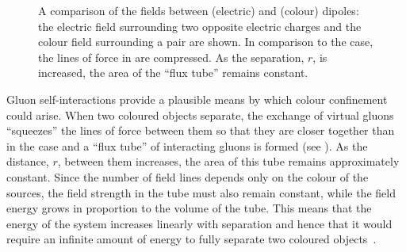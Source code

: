 \begin{figure}[htpb]
  \qquad
  \caption{A comparison of the fields between \QED (electric) and \QCD (colour) dipoles: \protect{} the electric field surrounding two opposite electric charges and \protect{} the colour field surrounding a \qqbar pair  are shown. In comparison to the \QED case, the lines of force in \QCD are compressed. As the \qqbar separation, $r$, is increased, the  area of the \QCD ``flux tube'' remains constant.}
  \label{fig:bg-theory:qedqcddipoles}
\end{figure}

Gluon self-interactions provide a plausible means by which colour confinement could arise.
When two coloured objects separate, the exchange of virtual gluons ``squeezes'' the lines of force between them so that they are closer together than in the \QED case and a ``flux tube'' of interacting gluons is formed (see ).
As the distance, $r$, between them increases, the \xs area of this tube remains approximately constant.
Since the number of field lines depends only on the colour of the sources, the field strength in the tube must also remain constant, while the field energy grows in proportion to the volume of the tube.
This means that the energy of the \qqbar system increases linearly with separation and hence that it would require an infinite amount of energy to fully separate two coloured objects~\cite{Gottfried:1986:concepts}.

